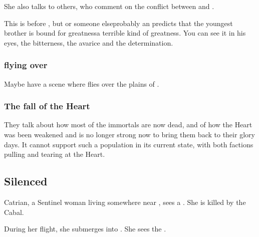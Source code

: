 \begin{garbage}
She also talks to others, who comment on the conflict between \Ishnaruchaefir{} and \Secherdamon. 

This is before , but \Nzessuacrith{} or someone else\dash probably an \ophidian\dash predicts that the youngest brother is bound for greatness\dash a terrible kind of greatness. 
You can see it in his eyes, the bitterness, the avarice and the determination. 





\subsubsection{\Nzessuacrith{} flying over \Machai}
Maybe have a scene where \Nzessuacrith{} flies over the plains of \Machai{}. 






\subsubsection{The fall of the Heart}
They talk about how most of the immortals are now dead, and of how the Heart was been weakened and is no longer strong now to bring them back to their glory days.
It cannot support such a population in its current state, with both factions pulling and tearing at the Heart. 









\subsection{Silenced}
Catrian, a Sentinel woman living somewhere near \Redce, sees a \bane{}. She is killed by the Cabal. 

During her flight, she submerges into \Nyx. She sees the . 


\end{garbage}
